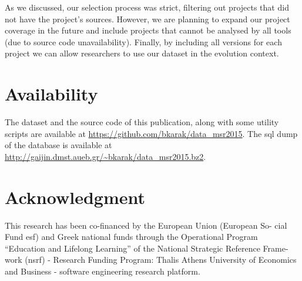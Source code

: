 \documentclass[conference]{IEEEtran}
\begin{document}
As we discussed, our selection process was strict, filtering out projects that did not have the project's sources. However, we are planning to expand our project coverage in the future and include projects that cannot be analysed by all tools (due to source code unavailability).
Finally, by including all versions for each project we can allow researchers to use our dataset in the evolution context.

\section{Availability}

The dataset and the source code of this publication, along with some utility scripts are available at \url{https://github.com/bkarak/data_msr2015}. The {\sc sql} dump of the database is available at \url{http://gaijin.dmst.aueb.gr/~bkarak/data_msr2015.bz2}.

\section*{Acknowledgment}

This research has been co-financed by the European Union (European So- cial Fund esf) and Greek national funds through the Operational Program ``Education and Lifelong Learning'' of the National Strategic Reference Frame- work (nsrf) - Research Funding Program: Thalis Athens University of Economics and Business - software engineering research platform.




\end{document}

